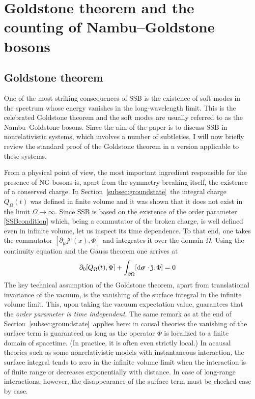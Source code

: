 \documentclass[final,3p,times,12pt,a4paper,sort&compress]{elsarticle}
\newcommand\vek[1]{{\boldsymbol{\bf #1}}}   %
\newcommand\de{\partial}
\newcommand\dd{\mathop{{\rm d}\!}\nolimits} %
\begin{document}
\section{Goldstone theorem and the counting of Nambu--Goldstone bosons}
\label{sec:goldstone}

\subsection{Goldstone theorem}
One of the most striking consequences of SSB is the existence of soft modes in
the spectrum whose energy vanishes in the long-wavelength limit. This is the
celebrated Goldstone theorem \cite{Goldstone:1961eq,Goldstone:1962es} and the
soft modes are usually referred to as the Nambu--Goldstone bosons. Since the
aim of the paper is to discuss SSB in nonrelativistic systems, which involves a
number of subtleties, I will now briefly review the standard proof of the
Goldstone theorem in a version applicable to these systems.

From a physical point of view, the most important ingredient responsible for
the presence of NG bosons is, apart from the symmetry breaking itself, the
existence of a conserved charge. In Section~\ref{subsec:groundstate}\ the
integral charge $Q_\Omega(t)$ was defined in finite volume and it was shown
that it does not exist in the limit $\Omega\to\infty$. Since SSB is based on
the existence of the order parameter \eqref{SSBcondition} which, being a
commutator of the broken charge, is well defined even in infinite volume, let
us inspect its time dependence. To that end, one takes the commutator
$[\de_\mu j^\mu(x),\Phi]$ and integrates it over the domain $\Omega$. Using the
continuity equation and the Gauss theorem one arrives at
\begin{equation}
\de_0[Q_\Omega(t),\Phi]+\int_{\de\Omega}[\dd\vek\sigma\cdot\vek j,\Phi]=0
\label{surface_int}
\end{equation}
The key technical assumption of the Goldstone theorem, apart from translational
invariance of the vacuum, is the vanishing of the surface integral in the
infinite volume limit. This, upon taking the vacuum expectation value,
guarantees that the \emph{order parameter is time independent}. The same remark
as at the end of Section~\ref{subsec:groundstate}\ applies here: in causal
theories the vanishing of the surface term is guaranteed as long as the
operator $\Phi$ is localized to a finite domain of spacetime. (In practice, it
is often even strictly local.) In acausal theories such as some nonrelativistic
models with instantaneous interaction, the surface integral tends to zero in
the infinite volume limit when the interaction is of finite range or decreases
exponentially with distance. In case of long-range interactions, however, the
disappearance of the surface term must be checked case by case.
\end{document}
